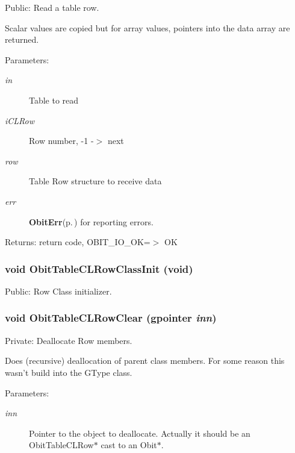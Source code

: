 Public: Read a table row. 

Scalar values are copied but for array values, pointers into the data array are returned. \begin{Desc}
\item[Parameters:]
\begin{description}
\item[{\em in}]Table to read \item[{\em i\-CLRow}]Row number, -1 -$>$ next \item[{\em row}]Table Row structure to receive data \item[{\em err}]{\bf Obit\-Err}{\rm (p.\,\pageref{structObitErr})} for reporting errors. \end{description}
\end{Desc}
\begin{Desc}
\item[Returns:]return code, OBIT\_\-IO\_\-OK=$>$ OK \end{Desc}
\subsubsection{\setlength{\rightskip}{0pt plus 5cm}void Obit\-Table\-CLRow\-Class\-Init (void)}\label{ObitTableCL_8c_a26}


Public: Row Class initializer. 

\subsubsection{\setlength{\rightskip}{0pt plus 5cm}void Obit\-Table\-CLRow\-Clear (gpointer {\em inn})}\label{ObitTableCL_8c_a7}


Private: Deallocate Row members. 

Does (recursive) deallocation of parent class members. For some reason this wasn't build into the GType class. \begin{Desc}
\item[Parameters:]
\begin{description}
\item[{\em inn}]Pointer to the object to deallocate. Actually it should be an Obit\-Table\-CLRow$\ast$ cast to an Obit$\ast$. \end{description}
\end{Desc}
